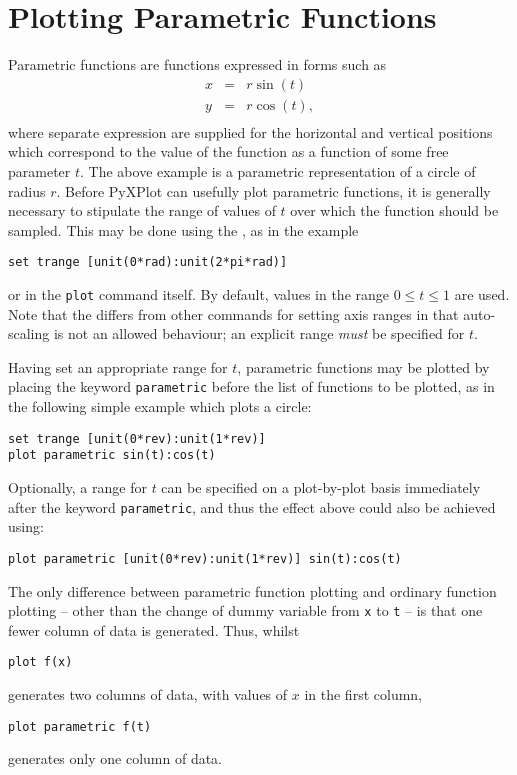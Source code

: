 \section{Plotting Parametric Functions}
\label{sec:parametric_plotting}

Parametric functions are functions expressed in forms such as
\begin{eqnarray*}
x & = & r \sin(t)  \\
y & = & r \cos(t) ,\\
\end{eqnarray*}
where separate expression are supplied for the horizontal and vertical
positions which correspond to the value of the function as a function of some
free parameter $t$. The above example is a parametric representation of a
circle of radius $r$. Before PyXPlot can usefully plot parametric functions, it
is generally necessary to stipulate the range of values of $t$ over which the
function should be sampled. This may be done using the , as
in the example
\begin{verbatim}
set trange [unit(0*rad):unit(2*pi*rad)]
\end{verbatim}
or in the {\tt plot} command itself. By default, values in the range $0\leq
t\leq1$ are used. Note that the  differs from other
commands for setting axis ranges in that auto-scaling is not an allowed
behaviour; an explicit range {\it must} be specified for $t$.

Having set an appropriate range for $t$, parametric functions may be plotted by
placing the keyword {\tt parametric} before the list of functions to be
plotted, as in the following simple example which plots a circle:
\begin{verbatim}
set trange [unit(0*rev):unit(1*rev)]
plot parametric sin(t):cos(t)
\end{verbatim}
Optionally, a range for $t$ can be specified on a plot-by-plot basis
immediately after the keyword {\tt parametric}, and thus the effect above could
also be achieved using:
\begin{verbatim}
plot parametric [unit(0*rev):unit(1*rev)] sin(t):cos(t)
\end{verbatim}
The only difference between parametric function plotting and ordinary function
plotting -- other than the change of dummy variable from {\tt x} to {\tt t} --
is that one fewer column of data is generated. Thus, whilst
\begin{verbatim}
plot f(x)
\end{verbatim}
generates two columns of data, with values of $x$ in the first column,
\begin{verbatim}
plot parametric f(t)
\end{verbatim}
generates only one column of data.

